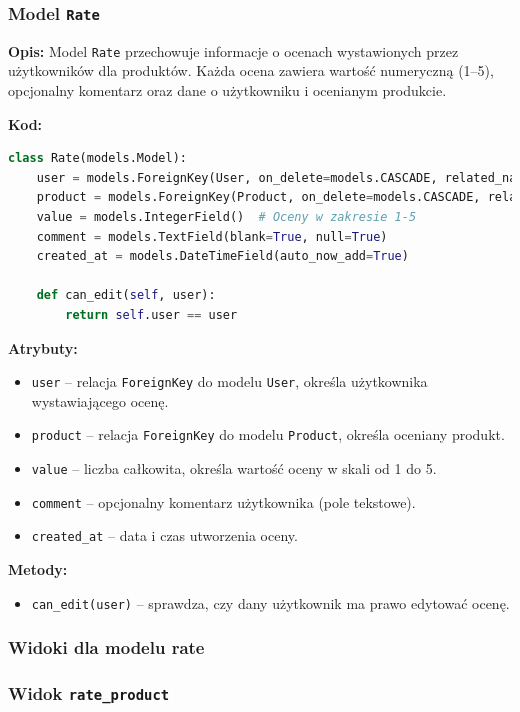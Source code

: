 \documentclass[12pt,a4paper,oneside]{article}
\theoremstyle{definition}
\numberwithin{equation}{section}
\begin{document}
\subsubsection{Model \texttt{Rate}}

\textbf{Opis:}  
Model \texttt{Rate} przechowuje informacje o ocenach wystawionych przez użytkowników dla produktów. Każda ocena zawiera wartość numeryczną (1–5), opcjonalny komentarz oraz dane o użytkowniku i ocenianym produkcie.

\textbf{Kod:}
\begin{lstlisting}[language=Python]
class Rate(models.Model):
    user = models.ForeignKey(User, on_delete=models.CASCADE, related_name='ratings')
    product = models.ForeignKey(Product, on_delete=models.CASCADE, related_name='ratings')
    value = models.IntegerField()  # Oceny w zakresie 1-5
    comment = models.TextField(blank=True, null=True)
    created_at = models.DateTimeField(auto_now_add=True)

    def can_edit(self, user):
        return self.user == user
\end{lstlisting}

\textbf{Atrybuty:}
\begin{itemize}
    \item \texttt{user} – relacja \texttt{ForeignKey} do modelu \texttt{User}, określa użytkownika wystawiającego ocenę.
    \item \texttt{product} – relacja \texttt{ForeignKey} do modelu \texttt{Product}, określa oceniany produkt.
    \item \texttt{value} – liczba całkowita, określa wartość oceny w skali od 1 do 5.
    \item \texttt{comment} – opcjonalny komentarz użytkownika (pole tekstowe).
    \item \texttt{created\_at} – data i czas utworzenia oceny.
\end{itemize}

\textbf{Metody:}
\begin{itemize}
    \item \texttt{can\_edit(user)} – sprawdza, czy dany użytkownik ma prawo edytować ocenę.
\end{itemize}


\subsubsection{Widoki dla modelu rate}

\subsubsection{Widok \texttt{rate\_product}}
\end{document}
